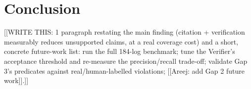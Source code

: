 \documentclass[conference]{IEEEtran}
\begin{document}
\section{Conclusion}
[[WRITE THIS: 1 paragraph restating the main finding (citation + verification
measurably reduces unsupported claims, at a real coverage cost) and a short,
concrete future-work list: run the full 184-log benchmark; tune the
Verifier's acceptance threshold and re-measure the precision/recall
trade-off; validate Gap 3's predicates against real/human-labelled
violations; [[Areej: add Gap 2 future work]].]]



\end{document}
